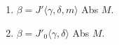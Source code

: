 \begin{enumerate}
\item $\beta = J' \langle \gamma, \delta, m \rangle$ Abs $M$.
\item $\beta = J'_0 \langle \gamma, \delta \rangle$ Abs $M$.
\end{enumerate}
